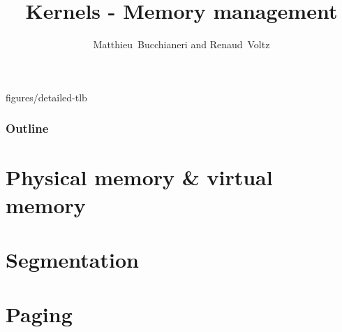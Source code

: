 
%
%



%
%

\title{Kernels - Memory management}

%
%

\author
{
  Matthieu~Bucchianeri and Renaud~Voltz
}

%
%

%


		{figures/detailed-tlb}

%
%



%
%

\begin{frame}
  \titlepage

  \begin{center}
    \logos
  \end{center}
\end{frame}

%
%

\begin{frame}
  \frametitle{Outline}
  \tableofcontents
\end{frame}

%
%

\section{Physical memory \& virtual memory}


%
%

\section{Segmentation}

%
%

\section{Paging}

